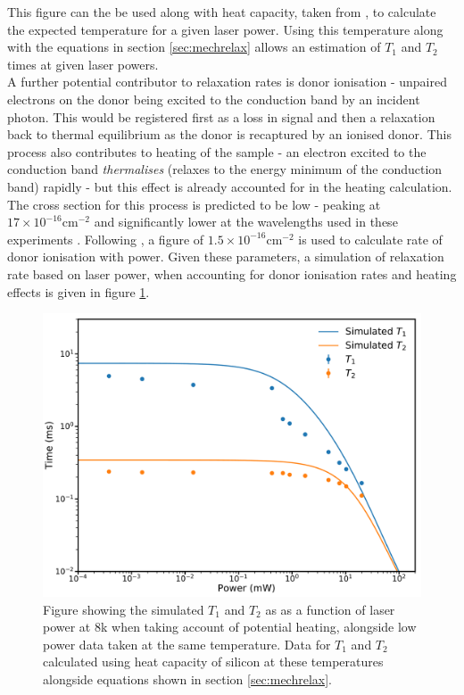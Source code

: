 This figure can the be used along with heat capacity, taken from \cite{Desai1986,Glazov2001}, to calculate the expected temperature for a given laser power.
Using this temperature along with the equations in section \ref{sec:mechrelax} allows an estimation of $T_1$ and $T_2$ times at given laser powers.
\\
A further potential contributor to relaxation rates is donor ionisation - unpaired electrons on the donor being excited to the conduction band by an incident photon.
This would be registered first as a loss in signal and then a relaxation back to thermal equilibrium as the donor is recaptured by an ionised donor.
This process also contributes to heating of the sample - an electron excited to the conduction band \emph{thermalises} (relaxes to the energy minimum of the conduction band) rapidly - but this effect is already accounted for in the heating calculation.
The cross section for this process is predicted to be low - peaking at $17\times10^{-16}\text{cm}^{-2}$ and significantly lower at the wavelengths used in these experiments \cite{Sclar1984,Ross2017a}. 
Following \cite{Ross2017a}, a figure of $1.5\times10^{-16}\text{cm}^{-2}$ is used to calculate rate of donor ionisation with power.
Given these parameters, a simulation of relaxation rate based on laser power, when accounting for donor ionisation rates and heating effects is given in figure \ref{fig:t1t2sim}.

\begin{figure}
\centering
\includegraphics[width = 0.8\columnwidth]{Figures/simt1t2.pdf} 
\caption[Simulated $T_1$ under heating]{Figure showing the simulated $T_1$ and $T_2$ as as a function of laser power at 8k when taking account of potential heating, alongside low power data taken at the same temperature. Data for $T_1$ and $T_2$ calculated using heat capacity of silicon at these temperatures alongside equations shown in section \ref{sec:mechrelax}.}
\label{fig:t1t2sim}
\end{figure}

